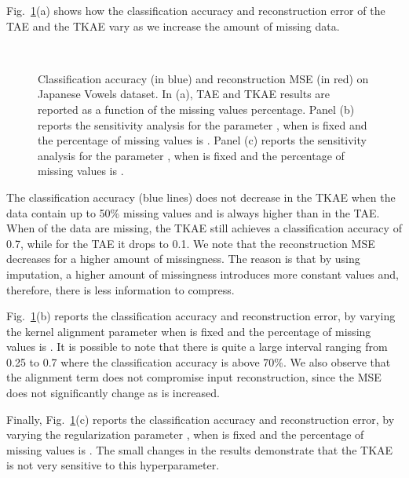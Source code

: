 \documentclass[a4paper,10pt,pdftex]{article}
\begin{document}
Fig.~\ref{fig:miss}(a) shows how the classification accuracy and reconstruction error of the TAE and the TKAE vary as we increase the amount of missing data.
\begin{figure}[ht!]
	\centering
    \hspace{-0.5em}
	~
	\hspace{-0.5em}
    ~

    \caption{\hspace{0pt}Classification accuracy (in blue) and reconstruction MSE (in red) on Japanese Vowels dataset. In (a), TAE and TKAE results are reported as a function of the missing values percentage. Panel (b) reports the sensitivity analysis for the parameter , when  is fixed and the percentage of missing values is . Panel (c) reports the sensitivity analysis for the parameter , when  is fixed and the percentage of missing values is .}
	\label{fig:miss}
\end{figure}
The classification accuracy (blue lines) does not decrease in the TKAE when the data contain up to 50\% missing values and is always higher than in the TAE.
When  of the data are missing, the TKAE still achieves a classification accuracy of 0.7, while for the TAE it drops to 0.1.
We note that the reconstruction MSE decreases for a higher amount of missingness. The reason is that by using imputation, a higher amount of missingness introduces more constant values and, therefore, there is less information to compress.

Fig.~\ref{fig:miss}(b) reports the classification accuracy and reconstruction error, by varying the kernel alignment parameter  when  is fixed and the percentage of missing values is .
It is possible to note that there is quite a large interval ranging from 0.25 to 0.7 where the classification accuracy is above 70\%.
We also observe that the alignment term does not compromise input reconstruction, since the MSE does not significantly change as  is increased.

Finally, Fig.~\ref{fig:miss}(c) reports the classification accuracy and reconstruction error, by varying the  regularization parameter ,  when  is fixed and the percentage of missing values is . 
The small changes in the results demonstrate that the TKAE is not very sensitive to this hyperparameter.
\end{document}
